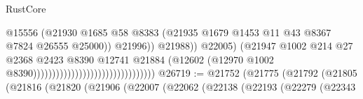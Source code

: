 \begin{lexlean}{RustCore}
\begin{coremodule}
                                                                        @15556
                                                                        (@21930
                                                                          @1685
                                                                          @58
                                                                          @8383
                                                                          (@21935
                                                                            @1679
                                                                            @1453
                                                                            @11
                                                                            @43
                                                                            @8367
                                                                            @7824
                                                                            @26555
                                                                            @25000))
                                                                        @21996))
                                                                    @21988))
                                                                @22005)
                                                              (@21947
                                                                @1002
                                                                @214
                                                                @27
                                                                @2368
                                                                @2423
                                                                @8390
                                                                @12741
                                                                @21884
                                                                (@12602
                                                                  (@12970
                                                                    @1002
                                                                    @8390))))))))))))))))))))))))))))))))
@26719 := @21752
    (@21775
      (@21792
        (@21805
          (@21816
            (@21820
              (@21906
                (@22007
                  (@22062
                    (@22138
                      (@22193
                        (@22279
                          (@22343

\end{coremodule}
\end{lexlean}
